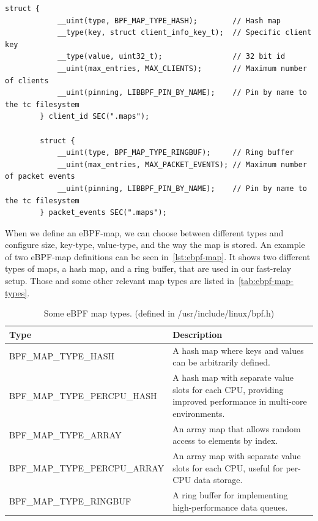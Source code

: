 \vspace{0.5cm}
\noindent\begin{minipage}{\textwidth}
    \begin{lstlisting}[style=CStyle,caption={Examplary eBPF map definitions.}, label={lst:ebpf-map}]
        struct {
            __uint(type, BPF_MAP_TYPE_HASH);        // Hash map
            __type(key, struct client_info_key_t);  // Specific client key
            __type(value, uint32_t);                // 32 bit id
            __uint(max_entries, MAX_CLIENTS);       // Maximum number of clients
            __uint(pinning, LIBBPF_PIN_BY_NAME);    // Pin by name to the tc filesystem
        } client_id SEC(".maps");

        struct {
            __uint(type, BPF_MAP_TYPE_RINGBUF);     // Ring buffer
            __uint(max_entries, MAX_PACKET_EVENTS); // Maximum number of packet events
            __uint(pinning, LIBBPF_PIN_BY_NAME);    // Pin by name to the tc filesystem
        } packet_events SEC(".maps");
    \end{lstlisting}
\end{minipage}
\vspace{0.5cm}

When we define an eBPF-map, we can choose between different types and configure
size, key-type, value-type, and the way the map is stored. %
An example of two eBPF-map definitions can be seen in~\autoref{lst:ebpf-map}.
It shows two different types of maps, a hash map, and a ring buffer, that are used in
our fast-relay setup.
Those and some other relevant map types are listed in~\autoref{tab:ebpf-map-types}.


\vspace{0.5cm}

\begin{table}[H]
    \centering
    \begin{tabular}{L{7cm}L{7cm}}
        \toprule
            Type & Description \\
        \midrule
            BPF\_MAP\_TYPE\_HASH & A hash map where keys and values can be arbitrarily defined. \\
        \midrule
            BPF\_MAP\_TYPE\_PERCPU\_HASH & A hash map with separate value slots for each CPU, providing improved performance in multi-core environments. \\
        \midrule
            BPF\_MAP\_TYPE\_ARRAY & An array map that allows random access to elements by index. \\
        \midrule
            BPF\_MAP\_TYPE\_PERCPU\_ARRAY & An array map with separate value slots for each CPU, useful for per-CPU data storage. \\
        \midrule
            BPF\_MAP\_TYPE\_RINGBUF & A ring buffer for implementing high-performance data queues. \\
        \bottomrule
    \end{tabular}
    \caption[Subset of eBPF map types]{Some eBPF map types. (defined in /usr/include/linux/bpf.h)}\label{tab:ebpf-map-types}
\end{table}

